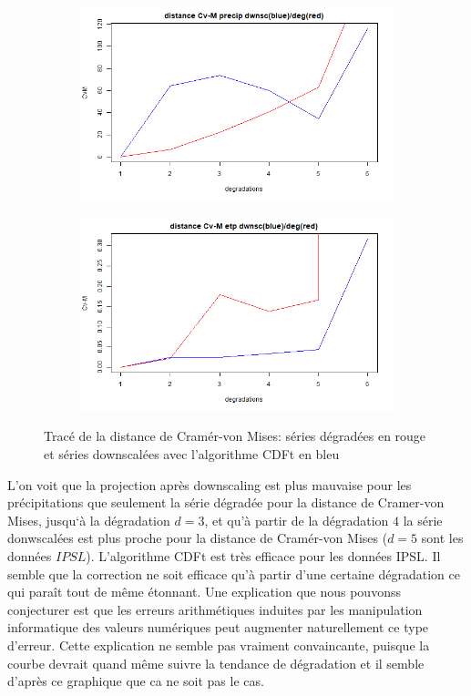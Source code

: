 \documentclass[a4paper,11pt]{article}
\numberwithin{equation}{section}
\begin{document}
\begin{figure}[H]
	\label{fig-res_CVM_CDFt}
	\centering
	\begin{subfigure}[b]{0.45\textwidth}
		\includegraphics[scale=0.4]{images/Dist_CVM_precip_CDFt.png}
	\end{subfigure}
	\hfill
	\begin{subfigure}[b]{0.45\textwidth}
		\includegraphics[scale=0.4]{images/Dist_CVM_evap_CDFt.png}
	\end{subfigure}
	\caption{Tracé de la distance de Cramér-von Mises: séries dégradées en rouge et séries downscalées avec l'algorithme CDFt en bleu}
\end{figure}

L'on voit que la projection après downscaling est plus mauvaise  pour les précipitations que seulement la série dégradée pour la distance de Cramer-von Mises, jusqu`à la dégradation $d=3$, et qu'à partir de la dégradation $4$ la série donwscalées est plus proche pour la distance de Cramér-von Mises ($d=5$ sont les données $IPSL$). L'algorithme CDFt est très efficace pour les données IPSL. Il semble que la correction ne soit efficace qu'à partir d'une certaine dégradation ce qui paraît tout de même étonnant. Une explication que nous pouvonss conjecturer est que les erreurs arithmétiques induites par les manipulation informatique des valeurs numériques peut augmenter naturellement ce type d'erreur. Cette explication ne semble pas vraiment convaincante, puisque la courbe devrait quand même suivre la tendance de dégradation et il semble d'après ce graphique que ca ne soit pas le cas.
\end{document}
